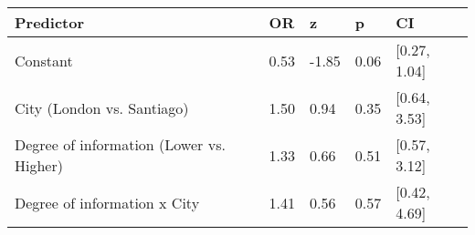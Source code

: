 \begin{tabular}{lllll}
  \toprule
Predictor & OR & z & p & CI \\ 
  \midrule
Constant & 0.53 & -1.85 & 0.06 & [0.27, 1.04] \\ 
  City (London vs. Santiago) & 1.50 & 0.94 & 0.35 & [0.64, 3.53] \\ 
  Degree of information (Lower vs. Higher) & 1.33 & 0.66 & 0.51 & [0.57, 3.12] \\ 
  Degree of information x City & 1.41 & 0.56 & 0.57 & [0.42, 4.69] \\ 
   \bottomrule
\end{tabular}
